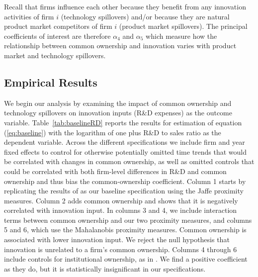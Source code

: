 \documentclass[12pt]{article}
\begin{document}
Recall that firms influence each other because they benefit from any innovation activities of firm $i$ (technology spillovers) and/or because they are natural product market competitors of firm $i$ (product market spillovers). The principal coefficients of interest are therefore $\alpha_{4}$ and $\alpha_{5}$ which measure how the relationship between common ownership and innovation varies with product market and technology spillovers.


\subsection{Empirical Results}

We begin our analysis by examining the impact of common ownership and technology spillovers on innovation inputs (R\&D expenses) as the outcome variable. Table~\ref{tab:baselineRD} reports the results for estimation of equation (\ref{eq:baseline}) with the logarithm of one plus R\&D to sales ratio as the dependent variable. Across the different specifications we include firm and year fixed effects to control for otherwise potentially omitted time trends that would be correlated with changes in common ownership, as well as omitted controls that could be correlated with both firm-level differences in R\&D and common ownership and thus bias the common-ownership coefficient. Column 1 starts by replicating the results of \cite{lucking2018spillovers} as our baseline specification using the Jaffe proximity measures. Column 2 adds common ownership and shows that it is negatively correlated with innovation input. In columns 3 and 4, we include interaction terms between common ownership and our two proximity measures, and columns 5 and 6, which use the Mahalanobis proximity measures. Common ownership is associated with lower innovation input. We reject the null hypothesis that innovation is unrelated to a firm's common ownership. Columns 4 through 6 include controls for institutional ownership, as in \cite{aghion2013innovation}. We find a positive coefficient as they do, but it is statistically insignificant in our specifications.
\end{document}
